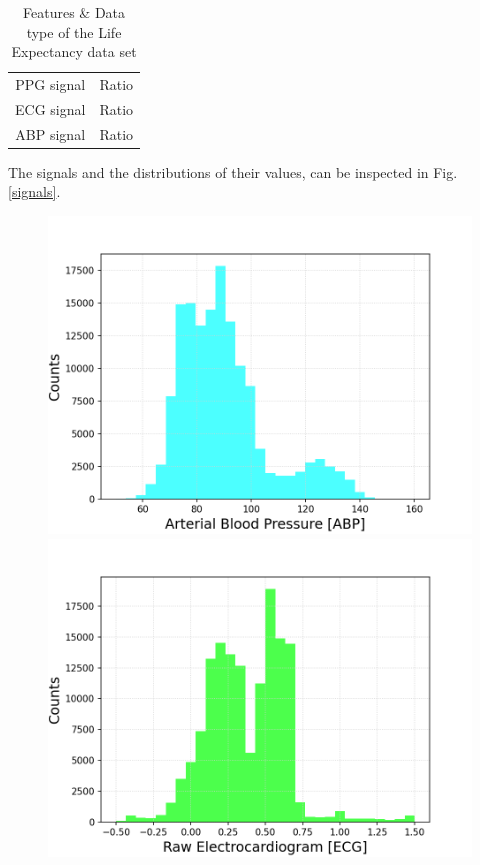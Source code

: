 \documentclass{article}
\begin{document}
\begin{table}
	\centering
	\begin{tabular}{ c c }
		\toprule
		PPG signal & Ratio \\
		ECG signal & Ratio \\
		ABP signal & Ratio \\
		\bottomrule
	\end{tabular}
	\caption{Features \& Data type of the Life Expectancy data set}
	\label{tab:bloodPress}
\end{table}

The signals and the distributions of their values, can be inspected in Fig. \ref{signals}.


\begin{figure}[h!]
	\centering
	\begin{minipage}[b]{0.32\textwidth}
		\includegraphics[width=\textwidth]{plots/histo_ABP.png}

	\end{minipage}
	\begin{minipage}[b]{0.32\textwidth}
		\includegraphics[width=\textwidth]{plots/histo_ECG.png}


\end{minipage}
\end{figure}
\end{document}
